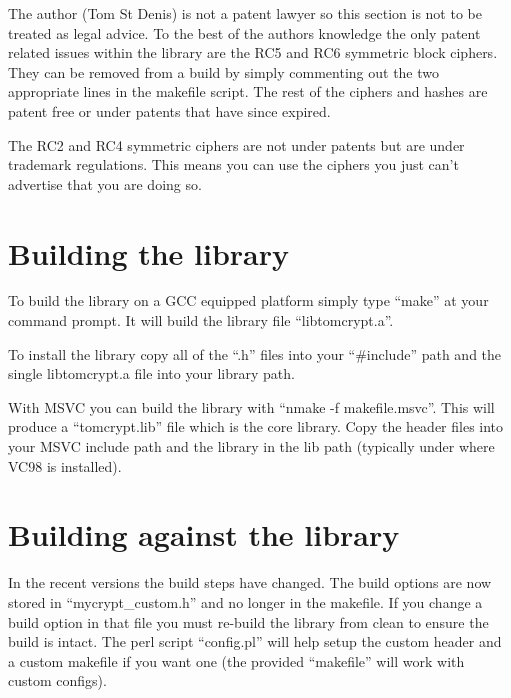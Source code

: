 \documentclass[b5paper]{book}
\begin{document}
The author (Tom St Denis) is not a patent lawyer so this section is not to be treated as legal advice.  To the best
of the authors knowledge the only patent related issues within the library are the RC5 and RC6 symmetric block ciphers.  
They can be removed from a build by simply commenting out the two appropriate lines in the makefile script.  The rest
of the ciphers and hashes are patent free or under patents that have since expired.

The RC2 and RC4 symmetric ciphers are not under patents but are under trademark regulations.  This means you can use 
the ciphers you just can't advertise that you are doing so.  

\section{Building the library}

To build the library on a GCC equipped platform simply type ``make'' at your command prompt.  It will build the library
file ``libtomcrypt.a''.  

To install the library copy all of the ``.h'' files into your ``\#include'' path and the single libtomcrypt.a file into 
your library path.

With MSVC you can build the library with ``nmake -f makefile.msvc''.  This will produce a ``tomcrypt.lib'' file which
is the core library.  Copy the header files into your MSVC include path and the library in the lib path (typically
under where VC98 is installed).

\section{Building against the library}

In the recent versions the build steps have changed.  The build options are now stored in ``mycrypt\_custom.h'' and
no longer in the makefile.  If you change a build option in that file you must re-build the library from clean to
ensure the build is intact.  The perl script ``config.pl'' will help setup the custom header and a custom makefile
if you want one (the provided ``makefile'' will work with custom configs).
\end{document}
